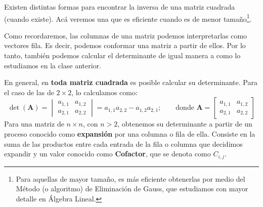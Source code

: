 \documentclass[12pt]{article}
\begin{document}
Existen distintas formas para encontrar la inversa de una matriz cuadrada (cuando existe). Acá veremos una que es eficiente cuando es de menor tamaño\footnote{Para aquellas de mayor tamaño, es más eficiente obtenerlas por medio del Método (o algoritmo) de Eliminación de Gauss, que estudiamos con mayor detalle en Álgebra Lineal.}.

Como recordaremos, las columnas de una matriz podemos interpretarlas como vectores fila. Es decir, podemos conformar una matriz a partir de ellos. Por lo tanto, también podemos calcular el determinante de igual manera a como lo estudiamos en la clase anterior.

\newpage

En general, en \textbf{toda matriz cuadrada} es posible calcular su determinante. Para el caso de las de $2 \times 2$, lo calculamos como:
\[
\det(\mathbf{A}) =
\begin{vmatrix}
a_{1,1} & a_{1,2} \\
a_{2,1} & a_{2,2}
\end{vmatrix} =
a_{1,1}a_{2,2} - a_{1,2}a_{2,1};
\qquad
\text{donde }
\mathbf{A} =
\begin{bmatrix}
a_{1,1} & a_{1,2} \\
a_{2,1} & a_{2,2}
\end{bmatrix}
\]
Para una matriz de $n \times n$, con $n > 2$, obtenemos su determinante a partir de un proceso conocido como \textbf{expansión} por una columna o fila de ella. Consiste en la suma de las productos entre cada entrada de la fila o columna que decidimos expandir y un valor conocido como \textbf{Cofactor}, que se denota como $C_{i, j}$.
\end{document}
